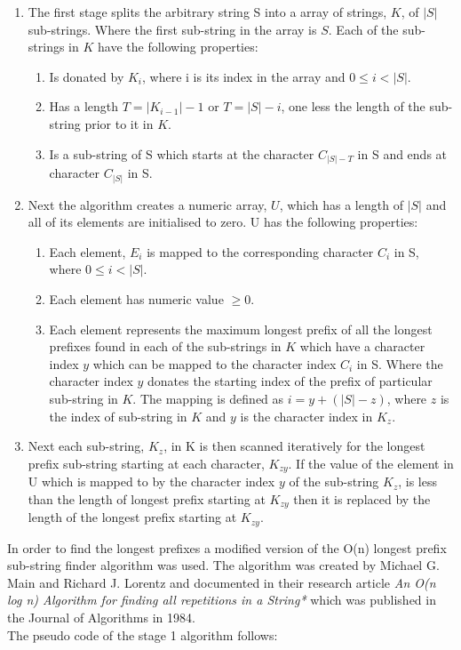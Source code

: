\documentclass[12pt]{article}
\begin{document}
\begin{flushleft}
		\begin{enumerate}	
		\item The first stage splits the arbitrary string S into a array of strings, $K$, of $|S|$ sub-strings. Where the first sub-string in the array is $S$.
		Each of the sub-strings in $K$ have the following properties:
			\begin{enumerate}
				\item Is donated by $K_{i}$, where i is its index in the array and $ 0 \le i < |S|$.
				\item Has a length $T = |K_{i-1}| - 1$ or $T = |S| - i$, one less the length of the sub-string prior to it in $K$.
				\item Is a sub-string of S which starts at the character $C_{|S| - T} $ in S and ends at character $C_{|S|}$ in S.
			\end{enumerate}
		
		\item Next the algorithm creates a numeric array, $U$, which has a length of $|S|$ and all of its elements are initialised to zero. 
		U has the following properties:
			\begin{enumerate}
				\item Each element, $E_{i}$ is mapped to the corresponding character $C_{i}$ in S, where $ 0 \le i < |S|$.
				\item Each element has numeric value $\ge 0$.
				\item Each element represents the maximum longest prefix of all the longest prefixes found in each of the sub-strings in $K$ which have a character index $y$ which can be mapped to the character index $C_{i}$ in S. Where the character index $y$ donates the starting index of the prefix of particular sub-string in $K$. The mapping is defined as $i = y + (|S| - z)$, where $z$ is the index of sub-string in $K$ and $y$ is the character index in $K_{z}$.  
				
			\end{enumerate}
		
		\item Next each sub-string, $K_{z}$, in K is then scanned iteratively for the longest prefix sub-string starting at each character, $K_{zy}$. If the value of the element in U which is mapped to by the character index $y$ of the sub-string $K_{z}$, is less than the length of longest prefix starting at $K_{zy}$ then it is replaced by the length of the longest prefix starting at $K_{zy}$. \\
		\end{enumerate}
		
		  
		In order to find the longest prefixes a modified version of the O(n) longest prefix sub-string finder algorithm was used. The algorithm was created by Michael G. Main and Richard J. Lorentz and documented in their research article \textit{An O(n log n) Algorithm for finding all repetitions in a String*} which was published in the Journal of Algorithms in 1984.\\
		
		The pseudo code of the stage 1 algorithm follows:
	
\end{flushleft}
\end{document}
